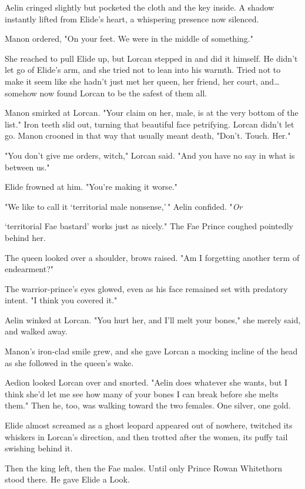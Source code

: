 Aelin cringed slightly but pocketed the cloth and the key inside.
A shadow instantly lifted from Elide's heart, a whispering presence now silenced.

Manon ordered, "On your feet.
We were in the middle of something."

She reached to pull Elide up, but Lorcan stepped in and did it himself.
He didn't let go of Elide's arm, and she tried not to lean into his warmth.
Tried not to make it seem like she hadn't just met her queen, her friend, her court, and\ldots somehow now found Lorcan to be the safest of them all.

Manon smirked at Lorcan.
"Your claim on her, male, is at the very bottom of the list."
Iron teeth slid out, turning that beautiful face petrifying.
Lorcan didn't let go.
Manon crooned in that way that usually meant death, "Don't.
Touch.
Her."

"You don't give me orders, witch," Lorcan said.
"And you have no say in what is between us."

Elide frowned at him.
"You're making it worse."

"We like to call it `territorial male nonsense,'\," Aelin confided.
"\emph{Or}

`territorial Fae bastard' works just as nicely."
The Fae Prince coughed pointedly behind her.

The queen looked over a shoulder, brows raised.
"Am I forgetting another term of endearment?"

The warrior-prince's eyes glowed, even as his face remained set with predatory intent.
"I think you covered it."

Aelin winked at Lorcan.
"You hurt her, and I'll melt your bones," she merely said, and walked away.

Manon's iron-clad smile grew, and she gave Lorcan a mocking incline of the head as she followed in the queen's wake.

Aedion looked Lorcan over and snorted.
"Aelin does whatever she wants, but I think she'd let me see how many of your bones I can break before she melts them."
Then he, too, was walking toward the two females.
One silver, one gold.

Elide almost screamed as a ghost leopard appeared out of nowhere, twitched its whiskers in Lorcan's direction, and then trotted after the women, its puffy tail swishing behind it.

Then the king left, then the Fae males.
Until only Prince Rowan Whitethorn stood there.
He gave Elide a Look.


